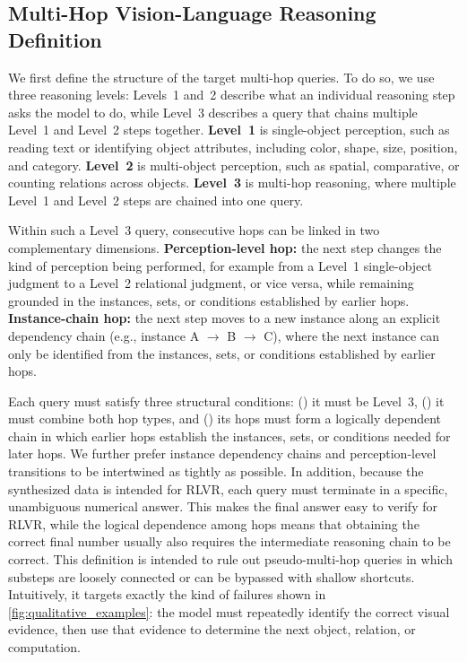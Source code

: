 \subsection{Multi-Hop Vision-Language Reasoning Definition}
\label{subsec:mh-vl-definition}

We first define the structure of the target multi-hop queries. To do so, we use three reasoning levels: Levels~1 and~2 describe what an individual reasoning step asks the model to do, while Level~3 describes a query that chains multiple Level~1 and Level~2 steps together.
\textbf{Level~1} is single-object perception, such as reading text or identifying object attributes, including color, shape, size, position, and category.
\textbf{Level~2} is multi-object perception, such as spatial, comparative, or counting relations across objects.
\textbf{Level~3} is multi-hop reasoning, where multiple Level~1 and Level~2 steps are chained into one query.

Within such a Level~3 query, consecutive hops can be linked in two complementary dimensions.
\textbf{Perception-level hop:} the next step changes the kind of perception being performed, for example from a Level~1 single-object judgment to a Level~2 relational judgment, or vice versa, while remaining grounded in the instances, sets, or conditions established by earlier hops.
\textbf{Instance-chain hop:} the next step moves to a new instance along an explicit dependency chain (e.g., instance A $\rightarrow$ B $\rightarrow$ C), where the next instance can only be identified from the instances, sets, or conditions established by earlier hops.

Each query must satisfy three structural conditions: () it must be Level~3, () it must combine both hop types, and () its hops must form a logically dependent chain in which earlier hops establish the instances, sets, or conditions needed for later hops.
We further prefer instance dependency chains and perception-level transitions to be intertwined as tightly as possible.
In addition, because the synthesized data is intended for RLVR, each query must terminate in a specific, unambiguous numerical answer.
This makes the final answer easy to verify for RLVR, while the logical dependence among hops means that obtaining the correct final number usually also requires the intermediate reasoning chain to be correct.
This definition is intended to rule out pseudo-multi-hop queries in which substeps are loosely connected or can be bypassed with shallow shortcuts.
Intuitively, it targets exactly the kind of failures shown in \cref{fig:qualitative_examples}: the model must repeatedly identify the correct visual evidence, then use that evidence to determine the next object, relation, or computation.

